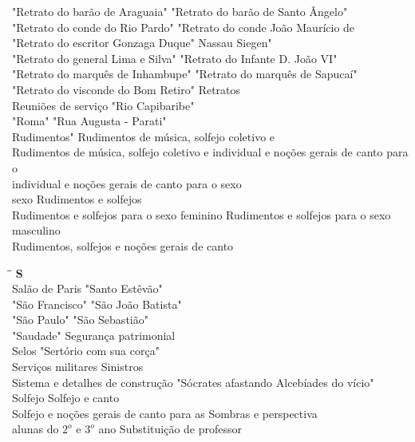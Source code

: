 \begin{tabbing}
	"Retrato do barão de Araguaia" \> "Retrato do barão de Santo Ângelo"\\
	"Retrato do conde do Rio Pardo" \> "Retrato do conde João Maurício de\\
	"Retrato do escritor Gonzaga Duque" \> Nassau Siegen"\\
	"Retrato do general Lima e Silva" \> "Retrato do Infante D. João VI"\\
	"Retrato do marquês de Inhambupe" \> "Retrato do marquês de Sapucaí"\\
	"Retrato do visconde do Bom Retiro"\> Retratos\\
	Reuniões de serviço \> "Rio Capibaribe"\\
	"Roma" \> "Rua Augusta - Parati"\\
	Rudimentos" \> Rudimentos de música, solfejo coletivo e\\
	Rudimentos de música, solfejo coletivo e\> individual e noções gerais de canto para o\\
	individual e noções gerais de canto para o \> sexo\\
	sexo \> Rudimentos e solfejos\\
	Rudimentos e solfejos para o sexo feminino \> Rudimentos e solfejos para o sexo masculino\\
	Rudimentos, solfejos e noções gerais de canto \> \\
\end{tabbing}

\begin{tabbing}
	\hspace{8,7cm}\=\hspace{1cm}\=\kill
	\textbf{S} \>  \\ 
	Salão de Paris \> "Santo Estêvão"\\
	"São Francisco" \> "São João Batista"\\
	"São Paulo"\> "São Sebastião"\\
	"Saudade" \> Segurança patrimonial\\ 
	Selos \>  "Sertório com sua corça"\\ 
	Serviços militares \> Sinistros\\ 
	Sistema e detalhes de construção  \> "Sócrates afastando Alcebíades do vício"\\
	Solfejo \> Solfejo e canto\\
	Solfejo e noções gerais de canto para as \> Sombras e perspectiva\\
	alunas do $2^o$ e $3^o$ ano \> Substituição de professor\\
\end{tabbing}

